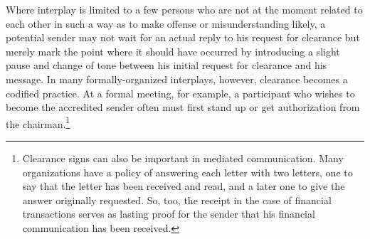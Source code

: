 \documentclass[twoside,symmetric,nobib,justified]{tufte-book}
\begin{document}
\newpage Where interplay is limited to a few persons who are not at the moment
related to each other in such a way as to make offense or
misunderstanding likely, a potential sender may not wait for an actual
reply to his request for clearance but merely mark the point where it
should have occurred by introducing a slight pause and change of tone
between his initial request for clearance and his message. In many
formally-organized interplays, however, clearance becomes a codified
practice. At a formal meeting, for example, a participant who wishes to
become the accredited sender often must first stand up or get
authorization from the chairman.\footnote{Clearance signs can also be
  important in mediated communication. Many organizations have a policy
  of answering each letter with two letters, one to say that the letter
  has been received and read, and a later one to give the answer
  originally requested. So, too, the receipt in the case of financial
  transactions serves as lasting proof for the sender that his financial
  communication has been received.}

\enlargethispage{\baselineskip}
\end{document}
